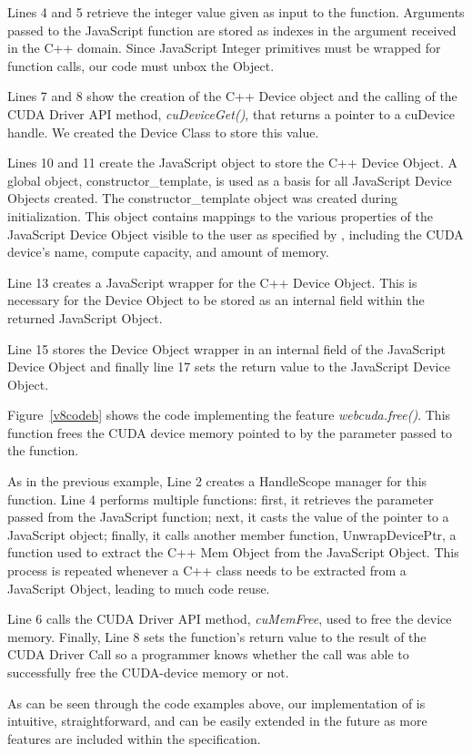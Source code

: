 Lines 4 and 5 retrieve the integer value given as
input to the function. Arguments passed to the JavaScript function are stored
as indexes in the argument received in the C++ domain. Since JavaScript
Integer primitives must be wrapped for function calls, our code must unbox the
Object.

Lines 7 and 8 show the creation of the C++ Device object and the calling of the
CUDA Driver API method, \textit{cuDeviceGet()}, that returns a pointer to a
cuDevice handle. We created the Device Class to store this value.

Lines 10 and 11 create the JavaScript object to store the C++ Device Object. A
global object, constructor\_template, is used as a basis for all JavaScript Device
Objects created. The constructor\_template object was created during
initialization. This object contains mappings to the various properties of the
JavaScript Device Object visible to the user as specified by \namens, including the
CUDA device's name, compute capacity, and amount of memory.

Line 13 creates a JavaScript wrapper for the C++ Device Object. This is
necessary for the Device Object to be stored as an internal field within the
returned JavaScript Object.

Line 15 stores the Device Object wrapper in an internal field of the JavaScript
Device Object and finally line 17 sets the return value to the JavaScript Device
Object.


Figure~\ref{v8codeb} shows the code implementing the \name feature
\textit{webcuda.free()}. This function frees the CUDA device memory pointed to by
the parameter passed to the function. 

As in the previous example, Line 2 creates a HandleScope manager for this
function.  Line 4 performs multiple functions: first, it retrieves the parameter
passed from the JavaScript function; next, it casts the value of the pointer to
a JavaScript object; finally, it calls another member function, UnwrapDevicePtr, a
function used to extract the C++ Mem Object from the JavaScript Object. This
process is repeated whenever a C++ class needs to be extracted from a JavaScript
Object, leading to much code reuse.

Line 6 calls the CUDA Driver API method, \textit{cuMemFree}, used to free the
device memory. Finally, Line 8 sets the function's return value to the result of
the CUDA Driver Call so a programmer knows whether the call was able to
successfully free the CUDA-device memory or not.


As can be seen through the code examples above, our implementation of \name is intuitive,
straightforward, and can be easily extended in the future as more features are
included within the \name specification.


